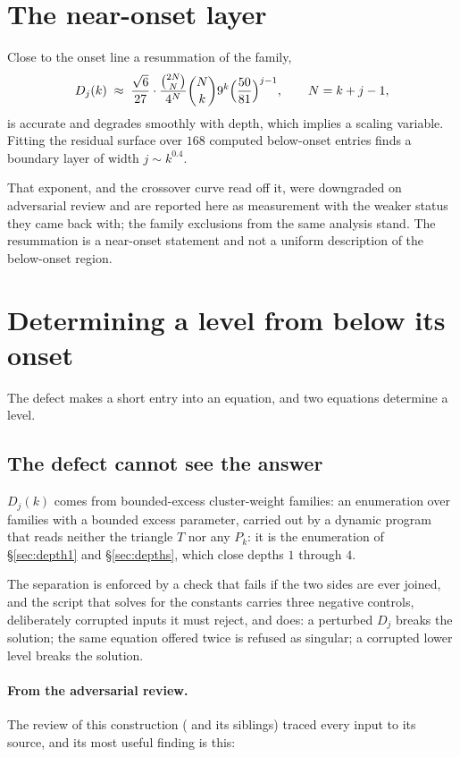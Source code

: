 \documentclass[11pt]{article}
\newcommand{\Dj}{D_j}
\begin{document}
\section{The near-onset layer}
\label{sec:crossover}

Close to the onset line a resummation of the family,
\[
  D_j(k) \;\approx\; \frac{\sqrt6}{27}\cdot\frac{\binom{2N}{N}}{4^N}
  \binom{N}{k}9^k\Bigl(\frac{50}{81}\Bigr)^{j-1}, \qquad N = k+j-1,
\]
is accurate and degrades smoothly with depth, which implies a scaling variable.
Fitting the residual surface over $168$ computed below-onset entries finds a boundary
layer of width $j \sim k^{0.4}$.

That exponent, and the crossover curve read off it, were downgraded on
adversarial review and are reported here as measurement with the weaker status
they came back with; the family exclusions from the same analysis stand. The
resummation is a near-onset statement and not a uniform description of the
below-onset region.

\section{Determining a level from below its onset}
\label{sec:tower}

The defect makes a short entry into an equation, and two equations determine
a level.

\subsection{The defect cannot see the answer}

$\Dj(k)$ comes from bounded-excess cluster-weight families: an enumeration over
families with a bounded excess parameter, carried out by a dynamic program that
reads neither the triangle $T$ nor any $P_k$: it is the enumeration of
\S\ref{sec:depth1} and \S\ref{sec:depths}, which close depths $1$ through $4$.

The separation is enforced by a check that fails if the two sides are ever
joined, and the script that solves for the constants carries three negative
controls, deliberately corrupted inputs it must reject, and does: a perturbed
$\Dj$ breaks the solution; the same equation offered twice is refused as
singular; a corrupted lower level breaks the solution.

\paragraph{From the adversarial review.} The review of this construction
( and its siblings) traced every input to
its source, and its most useful finding is this:
\end{document}
